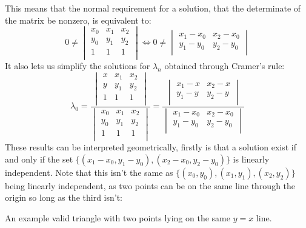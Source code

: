 This means that the normal requirement for a solution,
that the determinate of the matrix be nonzero,
is equivalent to:
\[
	0\neq
\begin{vmatrix}
	x_0&x_1&x_2\\
	y_0&y_1&y_2\\
	1&1&1\\
\end{vmatrix}
\Leftrightarrow
0\neq
\begin{vmatrix}
	x_1-x_0&x_2-x_0\\
	y_1-y_0&y_2-y_0\\
\end{vmatrix}
\]
It also lets us simplify the solutions for $\lambda_n$ obtained through Cramer's rule:
\[
	\lambda_0 = 
\frac
{\begin{vmatrix}
	x&x_1&x_2\\
	y&y_1&y_2\\
	1&1&1\\
\end{vmatrix}}
{\begin{vmatrix}
	x_0&x_1&x_2\\
	y_0&y_1&y_2\\
	1&1&1\\
\end{vmatrix}}
=
\frac
{\begin{vmatrix}
	x_1-x&x_2-x\\
	y_1-y&y_2-y\\
\end{vmatrix}}
{\begin{vmatrix}
	x_1-x_0&x_2-x_0\\
	y_1-y_0&y_2-y_0\\
\end{vmatrix}}
\]
These results can be interpreted geometrically,
firstly is that a solution exist if and only if the set $\{(x_1-x_0,y_1-y_0),(x_2-x_0,y_2-y_0)\}$ is linearly independent.
Note that this isn't the same as $\{(x_0,y_0),(x_1,y_1),(x_2,y_2)\}$ being linearly independent,
as two points can be on the same line through the origin so long as the third isn't:
\begin{center}

An example valid triangle with two points lying on the same $y=x$ line.
\end{center}
